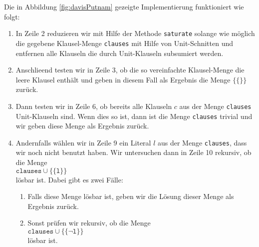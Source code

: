 Die in Abbildung \ref{fig:davisPutnam} gezeigte Implementierung funktioniert wie folgt:
\begin{enumerate}
\item In Zeile 2 reduzieren wir mit Hilfe der Methode \texttt{saturate} 
      solange wie m\"{o}glich die gegebene Klausel-Menge \texttt{clauses} mit Hilfe
      von Unit-Schnitten und entfernen alle Klauseln die durch Unit-Klauseln
      subsumiert werden.
\item Anschlie\3end testen wir in Zeile 3, ob die so vereinfachte Klausel-Menge
      die leere Klausel enth\"{a}lt und geben in diesem Fall als Ergebnis die Menge 
      $\bigl\{\{\}\bigr\}$ zur\"{u}ck.
\item Dann testen wir in Zeile 6, ob bereits alle Klauseln $c$ aus der Menge
      \texttt{clauses} Unit-Klauseln sind.  Wenn dies so ist,
      dann ist die Menge \texttt{clauses} trivial und wir geben diese Menge als Ergebnis zur\"{u}ck.
\item Andernfalls w\"{a}hlen wir in Zeile 9 ein Literal $l$ aus der Menge \texttt{clauses}, 
      dass wir noch nicht benutzt haben.
      Wir untersuchen dann in Zeile 10 rekursiv, ob die Menge \\[0.2cm]
      \hspace*{1.3cm} 
      $\mathtt{clauses} \cup \bigl\{\{\mathtt{l}\}\bigr\}$ 
      \\[0.2cm]
      l\"{o}sbar ist.  Dabei gibt es zwei F\"{a}lle:
      \begin{enumerate}
      \item Falls diese Menge l\"{o}sbar ist, geben wir die L\"{o}sung dieser Menge als Ergebnis zur\"{u}ck.

      \item Sonst  pr\"{u}fen wir rekursiv, ob die Menge \\[0.2cm]
            \hspace*{1.3cm} $\mathtt{clauses} \cup \bigl\{ \{ \neg \mathtt{l}\} \bigr\}$ \\[0.2cm]
            l\"{o}sbar ist.  
      \end{enumerate}
\end{enumerate}
